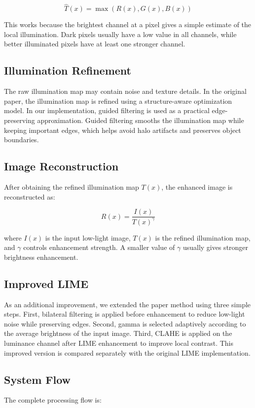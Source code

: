 \documentclass[11pt]{article}
\begin{document}
\begin{equation}
\hat{T}(x) = \max \left( R(x), G(x), B(x) \right)
\end{equation}

This works because the brightest channel at a pixel gives a simple estimate of the local illumination. Dark pixels usually have a low value in all channels, while better illuminated pixels have at least one stronger channel.

\subsection{Illumination Refinement}
The raw illumination map may contain noise and texture details. In the original paper, the illumination map is refined using a structure-aware optimization model. In our implementation, guided filtering is used as a practical edge-preserving approximation. Guided filtering smooths the illumination map while keeping important edges, which helps avoid halo artifacts and preserves object boundaries.

\subsection{Image Reconstruction}
After obtaining the refined illumination map $T(x)$, the enhanced image is reconstructed as:

\begin{equation}
R(x) = \frac{I(x)}{T(x)^\gamma}
\end{equation}

where $I(x)$ is the input low-light image, $T(x)$ is the refined illumination map, and $\gamma$ controls enhancement strength. A smaller value of $\gamma$ usually gives stronger brightness enhancement.

\subsection{Improved LIME}
As an additional improvement, we extended the paper method using three simple steps. First, bilateral filtering is applied before enhancement to reduce low-light noise while preserving edges. Second, gamma is selected adaptively according to the average brightness of the input image. Third, CLAHE is applied on the luminance channel after LIME enhancement to improve local contrast. This improved version is compared separately with the original LIME implementation.

\subsection{System Flow}
The complete processing flow is:
\end{document}
